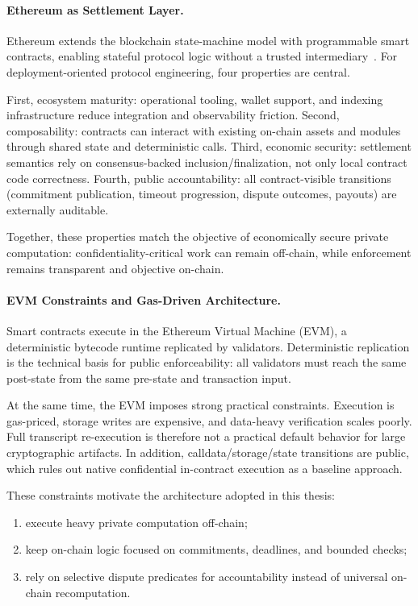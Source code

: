 \documentclass[final,twoside]{vutinfth}
\begin{document}
\paragraph*{Ethereum as Settlement Layer.}
Ethereum extends the blockchain state-machine model with programmable smart contracts, enabling stateful protocol logic without a trusted intermediary~\cite{Wood2025Ethereum}. For deployment-oriented protocol engineering, four properties are central.

First, ecosystem maturity: operational tooling, wallet support, and indexing infrastructure reduce integration and observability friction. Second, composability: contracts can interact with existing on-chain assets and modules through shared state and deterministic calls. Third, economic security: settlement semantics rely on consensus-backed inclusion/finalization, not only local contract code correctness. Fourth, public accountability: all contract-visible transitions (commitment publication, timeout progression, dispute outcomes, payouts) are externally auditable.

Together, these properties match the objective of economically secure private computation: confidentiality-critical work can remain off-chain, while enforcement remains transparent and objective on-chain.

\paragraph*{EVM Constraints and Gas-Driven Architecture.}
Smart contracts execute in the Ethereum Virtual Machine (EVM), a deterministic bytecode runtime replicated by validators. Deterministic replication is the technical basis for public enforceability: all validators must reach the same post-state from the same pre-state and transaction input.

At the same time, the EVM imposes strong practical constraints. Execution is gas-priced, storage writes are expensive, and data-heavy verification scales poorly. Full transcript re-execution is therefore not a practical default behavior for large cryptographic artifacts. In addition, calldata/storage/state transitions are public, which rules out native confidential in-contract execution as a baseline approach.

These constraints motivate the architecture adopted in this thesis:
\begin{enumerate}
\item execute heavy private computation off-chain;
\item keep on-chain logic focused on commitments, deadlines, and bounded checks;
\item rely on selective dispute predicates for accountability instead of universal on-chain recomputation.
\end{enumerate}
\end{document}
